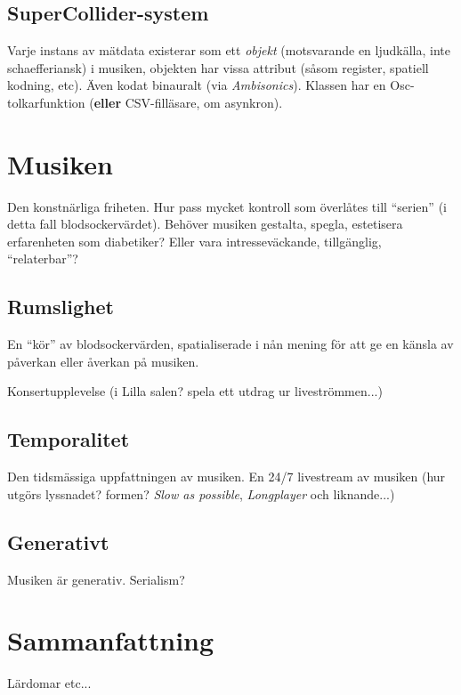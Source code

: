 \documentclass[11pt, twoside, a4paper]{article}
\begin{document}
\begin{multicols}{2}
\subsection*{SuperCollider-system}
Varje instans av mätdata existerar som ett \emph{objekt} (motsvarande en ljudkälla, inte schaefferiansk) i musiken, objekten har vissa attribut (såsom register, spatiell kodning, etc). Även kodat binauralt (via \emph{Ambisonics}). Klassen har en Osc-tolkarfunktion (\textbf{eller} CSV-filläsare, om asynkron).

\section*{Musiken}
Den konstnärliga friheten. Hur pass mycket kontroll som överlåtes till \enquote{serien} (i detta fall blodsockervärdet). Behöver musiken gestalta, spegla, estetisera erfarenheten som diabetiker? Eller vara intresseväckande, tillgänglig, \enquote{relaterbar}? 

\subsection*{Rumslighet}
En \enquote{kör} av blodsockervärden, spatialiserade i nån mening för att ge en känsla av påverkan eller åverkan på musiken. 

Konsertupplevelse (i Lilla salen? spela ett utdrag ur liveströmmen...)

\subsection*{Temporalitet}
Den tidsmässiga uppfattningen av musiken. En 24/7 livestream av musiken (hur utgörs lyssnadet? formen? \emph{Slow as possible}, \emph{Longplayer} och liknande...)

\subsection*{Generativt}
Musiken är generativ. Serialism?

\section*{Sammanfattning}
Lärdomar etc...

\end{multicols}

\twocolumn

\printbibliography[type=book,title={Böcker}]
\printbibliography[type=article,title={Artiklar}]
\end{document}
